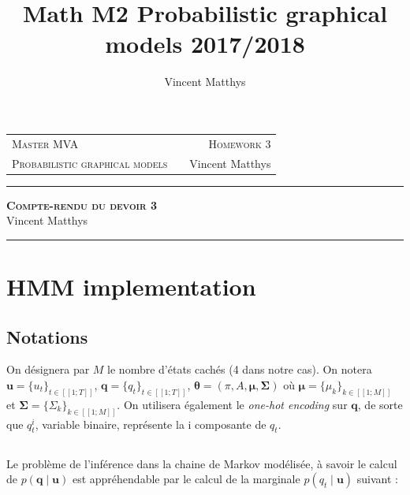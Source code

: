 \documentclass[12pt,a4paper,onecolumn]{article}
\title{Math M2 Probabilistic graphical models 2017/2018}
\author{Vincent Matthys}
\begin{document}
\begin{tabularx}{0.8\textwidth}{@{} l X r @{} }
	{\textsc{Master MVA}}                   &  & \textsc{Homework 3} \\
	\textsc{Probabilistic graphical models} &  & {Vincent Matthys}   \\
\end{tabularx}
\vspace{1.5cm}
\begin{center}
	\rule[11pt]{5cm}{0.5pt}

	\textbf{\LARGE \textsc{Compte-rendu du devoir 3}}
	\vspace{0.5cm}\\
	Vincent Matthys\\
	\rule{5cm}{0.5pt}
	\vspace{1.5cm}
\end{center}

\section{HMM implementation}



\setcounter{subsection}{-1}
\subsection{Notations}

On désignera par \(M\) le nombre d'états cachés (4 dans notre cas).
On notera \(\bm{u} = \{u_t\}_{t \in [\![1;T]\!]}\), \(\bm{q} = \{q_t\}_{t \in [\![1;T]\!]}\), \(\bm{\theta} = \left(\pi, A, \bm{\mu}, \bm{\Sigma}\right)\) où \(\bm{\mu} = \{\mu_k\}_{k \in [\![1;M]\!]}\) et \(\bm{\Sigma} = \{\Sigma_k\}_{k \in [\![1;M]\!]}\).
On utilisera également le \textit{one-hot encoding} sur \(\bm{q}\), de sorte que \(q_t^i\), variable binaire, représente la i composante de \(q_t\).

\subsection{}

Le problème de l'inférence dans la chaine de Markov modélisée, à savoir le calcul de \(p(\bm{q} \mid \bm{u})\) est appréhendable par le calcul de la marginale \(p(q_t \mid \bm{u})\) suivant :
\end{document}
